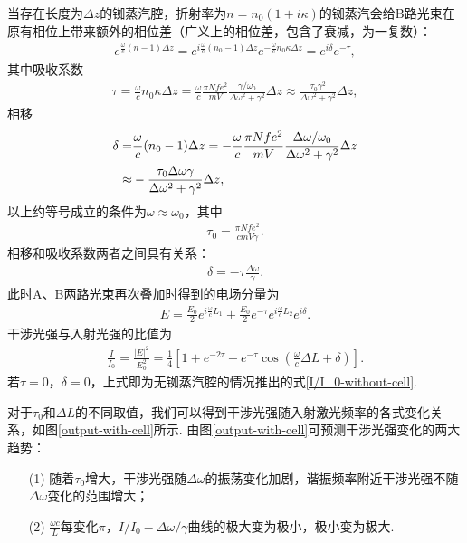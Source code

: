 \documentclass[a4paper, 10pt]{article}
\providecommand{\abs}[1]{\left\lvert#1\right\rvert} %
\begin{document}
\begin{multicols*}{2}
当存在长度为$\Delta z$的铷蒸汽腔，折射率为$n=n_0(1+i\kappa)$的铷蒸汽会给B路光束在原有相位上带来额外的相位差（广义上的相位差，包含了衰减，为一复数）：
\begin{align}
    e^{\frac{\omega}{c}(n-1)\Delta z}=e^{i\frac{\omega}{c}(n_0-1)\Delta z}e^{-\frac{\omega}{c}n_0\kappa\Delta z}=e^{i\delta}e^{-\tau},
\end{align}
其中吸收系数
\begin{align}
    \tau=\frac{\omega}{c}n_0\kappa\Delta z=\frac{\omega}{c}\frac{\pi Nfe^2}{mV}\frac{\gamma/\omega_0}{\Delta\omega^2+\gamma^2}\Delta z\approx\frac{\tau_0\gamma^2}{\Delta\omega^2+\gamma^2}\Delta z,
\end{align}
相移
\begin{align}
    \notag\delta=&\frac{\omega}{c}(n_0-1)\Delta z=-\frac{\omega}{c}\frac{\pi Nfe^2}{mV}\frac{\Delta\omega/\omega_0}{\Delta\omega^2+\gamma^2}\Delta z\\
    \approx&-\frac{\tau_0\Delta\omega\gamma}{\Delta\omega^2+\gamma^2}\Delta z,
\end{align}
以上约等号成立的条件为$\omega\approx\omega_0$，其中
\begin{align}
    \tau_0=\frac{\pi Nfe^2}{cmV\gamma}.
\end{align}
相移和吸收系数两者之间具有关系：
\begin{align}
    \delta=-\tau\frac{\Delta\omega}{\gamma}.
\end{align}
此时A、B两路光束再次叠加时得到的电场分量为
\begin{align}
    E=\frac{E_0}{2}e^{i\frac{\omega}{c}L_1}+\frac{E_0}{2}e^{-\tau}e^{i\frac{\omega}{c}L_2}e^{i\delta}.
\end{align}
干涉光强与入射光强的比值为
\begin{align}
    \label{I/I_0-with-cell}
    \frac{I}{I_0}=\frac{\abs{E}^2}{E_0^2}=\frac{1}{4}\left[1+e^{-2\tau}+e^{-\tau}\cos\left(\frac{\omega}{c}\Delta L+\delta\right)\right].
\end{align}
若$\tau=0$，$\delta=0$，上式即为无铷蒸汽腔的情况推出的式\eqref{I/I_0-without-cell}.

对于$\tau_0$和$\Delta L$的不同取值，我们可以得到干涉光强随入射激光频率的各式变化关系，如图\ref{output-with-cell}所示. 由图\ref{output-with-cell}可预测干涉光强变化的两大趋势：
\begin{itemize}
    \item[(1)] 随着$\tau_0$增大，干涉光强随$\Delta\omega$的振荡变化加剧，谐振频率附近干涉光强不随$\Delta\omega$变化的范围增大；
    \item[(2)] $\frac{\omega c}{L}$每变化$\pi$，$I/I_0-\Delta\omega/\gamma$曲线的极大变为极小，极小变为极大.
\end{itemize}


\end{multicols*}
\end{document}
